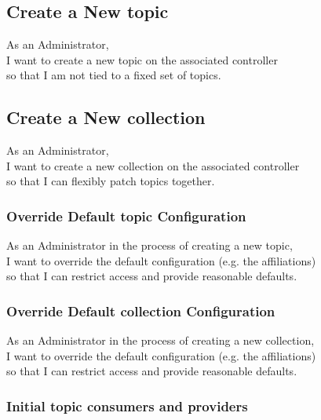 \subsection{Create a New topic}\label{sec:create-topic}

As an Administrator,\\
I want to create a new topic on the associated controller\\
so that I am not tied to a fixed set of topics.

\subsection{Create a New collection}\label{sec:create-collection}

As an Administrator,\\
I want to create a new collection on the associated controller\\
so that I can flexibly patch topics together.

\subsubsection{Override Default topic Configuration}\label{sec:requirement-topic-default-configuration}

As an Administrator in the process of creating a new topic,\\
I want to override the default configuration (e.g. the affiliations) \\
so that I can restrict access and provide reasonable defaults.

\subsubsection{Override Default collection Configuration}\label{sec:requirement-collection-default-configuration}

As an Administrator in the process of creating a new collection,\\
I want to override the default configuration (e.g. the affiliations) \\
so that I can restrict access and provide reasonable defaults.

\subsubsection{Initial topic consumers and providers}\label{sec:requirement-initial-topic-consumer-provider}

